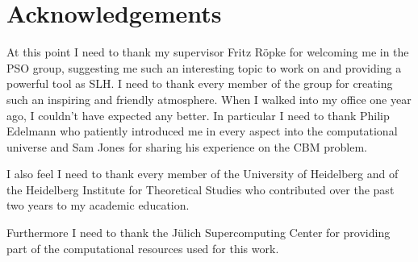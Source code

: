 \chapter*{Acknowledgements}
\thispagestyle{empty}
At this point I need to thank my supervisor Fritz Röpke for welcoming me in the PSO group, suggesting me such an interesting topic to work on and providing a powerful tool as SLH. I need to thank every member of the group for creating such an inspiring and friendly atmosphere. When I walked into my office one year ago, I couldn't have expected any better. In particular I need to thank Philip Edelmann who patiently introduced me in every aspect into the computational universe and Sam Jones for sharing his experience on the CBM problem.

I also feel I need to thank every member of the University of Heidelberg and of the Heidelberg Institute for Theoretical Studies who contributed over the past two years to my academic education.

Furthermore I need to thank the Jülich Supercomputing Center for providing part of the computational resources used for this work.

